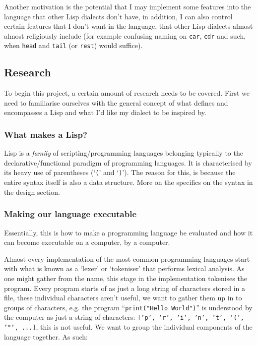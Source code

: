 \documentclass{article}
\newcommand{\code}[1]{\texttt{#1}}
\begin{document}
    Another motivation is the potential that I may implement some features
    into the language that other Lisp dialects don't have, in addition, I can
    also control certain features that I don't want in the language, that
    other Lisp dialects almost almost religiously include (for example
    confusing naming on \code{car}, \code{cdr} and such, when \code{head}
    and \code{tail} (or \code{rest}) would suffice).

  \subsection{Research}
    To begin this project, a certain amount of research needs to be covered.
    First we need to familiarise ourselves with the general concept of what
    defines and encompasses a Lisp and what I'd like my dialect to be
    inspired by.

    \subsubsection{What makes a Lisp?}
    Lisp is a \emph{family} of scripting/programming languages belonging typically
    to the declarative/functional paradigm of programming languages. It is
    characterised by its heavy use of parentheses (`\code(' and `\code)').
    The reason for this, is because the entire
    syntax itself is also a data structure\autocite{milestones}.
    More on the specifics on the syntax in the design section.

    \subsubsection{Making our language executable}
    Essentially, this is how to make a programming language be evaluated and
    how it can become executable on a computer, by a computer.

    Almost every implementation of the most common programming languages start
    with what is known as a `lexer' or `tokeniser' that performs lexical analysis.
    As one might gather from the name, this stage in the
    implementation tokenises the program.
    Every program starts of as just a long string of characters stored in a file, these
    individual characters aren't useful, we want to gather them up in to groups
    of characters, e.g. the program ``\code{print("Hello World")}'' is understood by
    the computer as just a string of characters:
    \code{['p', 'r', 'i', 'n', 't', '(', '"', ...]}, this is not useful.
    We want to group the individual components of the language together.
    As such:
\end{document}
